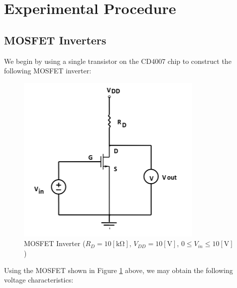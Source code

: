 \documentclass[
	letterpaper, %
	10pt, %
]{CSUniSchoolLabReport}
\begin{document}
\newpage

\section{Experimental Procedure}

\subsection{MOSFET Inverters}

We begin by using  a single transistor on the CD4007 chip to construct the following MOSFET inverter:

\begin{figure}[H]
  \centering
  \includegraphics[width=.8\textwidth]{Figures/L5F1}
  \caption{MOSFET Inverter ($R_D=10[\si{\kilo\ohm}]$, $V_{DD}=10[\si{\volt}]$, $0\leq V_{in}\leq 10[\si{\volt}]$)}
  \label{fig:1}
\end{figure}

Using the MOSFET shown in Figure \ref{fig:1} above, we may obtain the following voltage characteristics:
\end{document}
